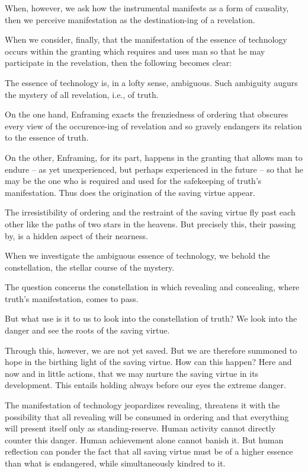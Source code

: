 \documentclass[paper=a4, fontsize=11pt,twoside]{scrartcl}
\begin{document}
When, however, we ask how the instrumental manifests as a form of causality, then we perceive manifestation as the destination-ing of a revelation.

When we consider, finally, that the manifestation of the essence of technology occurs within the granting which requires and uses man so that he may participate in the revelation, then the following becomes clear:

The essence of technology is, in a lofty sense, ambiguous. Such ambiguity augurs the mystery of all revelation, i.e., of truth.

On the one hand, Enframing exacts the frenziedness of ordering that obscures every view of the occurence-ing of revelation and so gravely endangers its relation to the essence of truth.

On the other, Enframing, for its part, happens in the granting that allows man to endure -- as yet unexperienced, but perhaps experienced in the future -- so that he may be the one who is required and used for the safekeeping of truth's manifestation. Thus does the origination of the saving virtue appear.

The irresistibility of ordering and the restraint of the saving virtue fly past each other like the paths of two stars in the heavens. But precisely this, their passing by, is a hidden aspect of their nearness.

When we investigate the ambiguous essence of technology, we behold the constellation, the stellar course of the mystery.

The question concerns the constellation in which revealing and concealing, where truth's manifestation, comes to pass.

But what use is it to us to look into the constellation of truth? We look into the danger and see the roots of the saving virtue.

Through this, however, we are not yet saved. But we are therefore summoned to hope in the birthing light of the saving virtue. How can this happen? Here and now and in little actions, that we may nurture the saving virtue in its development. This entails holding always before our eyes the extreme danger.

The manifestation of technology jeopardizes revealing, threatens it with the possibility that all revealing will be consumed in ordering and that everything will present itself only as standing-reserve. Human activity cannot directly counter this danger. Human achievement alone cannot banish it. But human reflection can ponder the fact that all saving virtue must be of a higher essence than what is endangered, while simultaneously kindred to it.
\end{document}
